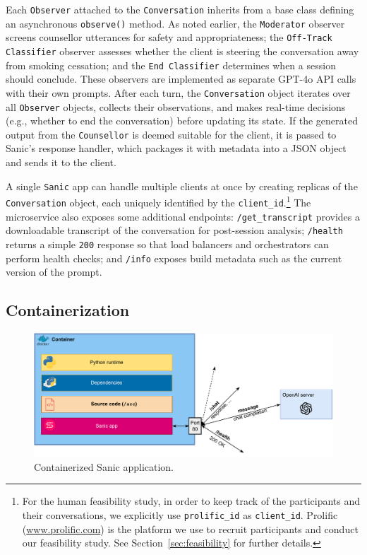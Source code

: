 Each \texttt{Observer} attached to the \texttt{Conversation} inherits from a base class defining an asynchronous \texttt{observe()} method. As noted earlier, the \texttt{Moderator} observer screens counsellor utterances for safety and appropriateness; the \texttt{Off-Track Classifier} observer assesses whether the client is steering the conversation away from smoking cessation; and the \texttt{End Classifier} determines when a session should conclude. These observers are implemented as separate GPT-4o API calls with their own prompts. After each turn, the \texttt{Conversation} object iterates over all \texttt{Observer} objects, collects their observations, and makes real-time decisions (e.g., whether to end the conversation) before updating its state. If the generated output from the \texttt{Counsellor} is deemed suitable for the client, it is passed to Sanic's response handler, which packages it with metadata into a JSON object and sends it to the client.

A single \texttt{Sanic} app can handle multiple clients at once by creating replicas of the \texttt{Conversation} object, each uniquely identified by the \texttt{client\_id}.\footnote{For the human feasibility study, in order to keep track of the participants and their conversations, we explicitly use \texttt{prolific\_id} as \texttt{client\_id}. Prolific (\url{www.prolific.com}) is the platform we use to recruit participants and conduct our feasibility study. See Section~\ref{sec:feasibility} for further details.} The microservice also exposes some additional endpoints: \texttt{/get\_transcript} provides a downloadable transcript of the conversation for post-session analysis; \texttt{/health} returns a simple \texttt{200} response so that load balancers and orchestrators can perform health checks; and \texttt{/info} exposes build metadata such as the current version of the prompt.

\subsection{Containerization}

\begin{figure}[ht]
  \centering
  \includegraphics[width=0.7\linewidth]{fig/container.drawio.pdf} 
  \caption{Containerized Sanic application.}
  \label{fig:containerization}
\end{figure}

